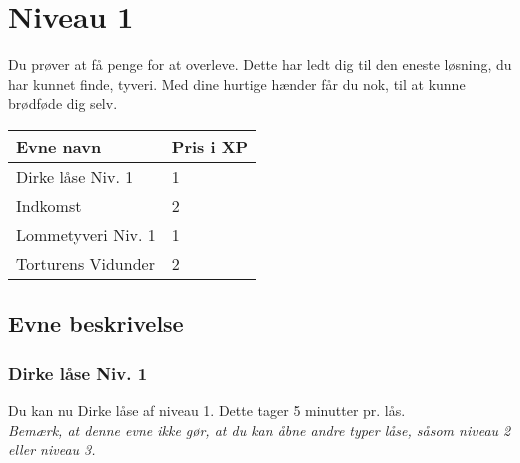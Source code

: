 \chapter{Niveau 1}
Du prøver at få penge for at overleve. Dette har ledt dig til den eneste løsning, du har kunnet finde, tyveri. Med dine hurtige hænder får du nok, til at kunne brødføde dig selv.
\begin{table}[H]
    \centering
    \begin{tabular}{|p{}|p{}|}
    \rowcolor{cerulean!80}\hline
        Evne navn & Pris i XP \\\hline
         Dirke låse Niv. 1 & 1 \\\hline
         Indkomst & 2 \\\hline
         Lommetyveri Niv. 1 & 1\\\hline
         Torturens Vidunder & 2 \\
         \hline
    \end{tabular}
\end{table}

\section{Evne beskrivelse}

\subsection{Dirke låse Niv. 1}
Du kan nu Dirke låse af niveau 1. Dette tager 5 minutter pr. lås.\\
\emph{Bemærk, at denne evne ikke gør, at du kan åbne andre typer låse, såsom niveau 2 eller niveau 3.}\\





